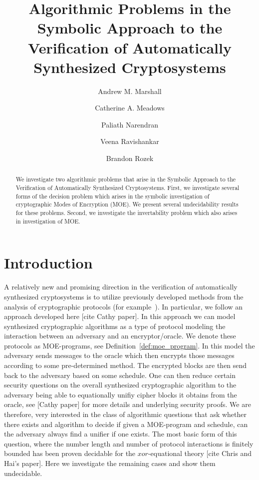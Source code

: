 \documentclass{easychair}
\title{Algorithmic Problems in the Symbolic Approach to the Verification of Automatically Synthesized Cryptosystems}
\author{Andrew M. Marshall \inst{1} 
	\and Catherine A. Meadows \inst{2} 
	\and Paliath Narendran \inst{3} 
	\and Veena Ravishankar \inst{1} 
	\and Brandon Rozek \inst{4} }
\institute{University of Mary Washington, Fredericksburg, VA, USA
	\and Naval Research Laboratory, Washington, DC, USA
	\and University at Albany--SUNY, Albany, NY, USA 
	\and Naval Surface Warfare Center Dahlgren Division, Dahlgren, VA, USA}
\begin{document}
\maketitle
\begin{abstract}
We investigate two algorithmic problems that arise in the Symbolic Approach to the Verification of Automatically Synthesized Cryptosystems. First, we investigate several forms of
the decision problem which arises in the symbolic investigation 
of cryptographic Modes of Encryption (MOE). We present several
undecidability results for these problems. Second, we investigate
the invertability problem which also arises in investigation of
MOE.    

\end{abstract}



\section{Introduction}
A relatively new and promising direction in the verification of
automatically synthesized cryptosystems is to utilize previously developed methods from the analysis of cryptographic protocols 
(for example~\cite{malozemoff2014automated}).
In particular, we follow an approach developed here [cite Cathy paper].
In this approach we can model synthesized cryptographic algorithms
as a type of protocol modeling the interaction between an adversary
and an encryptor/oracle. We denote these protocols as 
MOE-programs, see Definition~\ref{def:moe_program}.
In this model the adversary sends messages to the oracle which then 
encrypts those messages according to some pre-determined 
method. The encrypted blocks are then send back to the adversary 
based on some schedule. One can then reduce certain security
questions on the overall synthesized cryptographic algorithm to
the adversary being able to equationally unifiy cipher blocks
it obtains from the oracle, see [Cathy paper] for more details
and underlying security proofs. We are therefore, very interested 
in the class of algorithmic questions that ask whether there exists
and algorithm to decide if given a MOE-program and schedule, can
the adversary always find a unifier if one exists. The most basic form
of this question, where the number length and number of protocol 
interactions is finitely bounded has been proven decidable for the
$xor$-equational theory [cite Chris and Hai's paper]. 
Here we investigate the remaining cases and show them undecidable.
\end{document}

